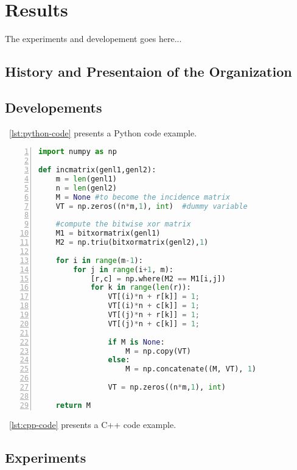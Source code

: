 \chapter{Results}\label{chap:Results}

The experiments and developement goes here...

\section{History and Presentaion of the Organization}


\section{Developements} \label{sec:dev}


\lstlistingname~\ref{lst:python-code} presents a Python code example.

\begin{lstlisting}[numbers=left, language=Python, style=mycode, caption={Python code example.}, label={lst:python-code}]
import numpy as np
 
def incmatrix(genl1,genl2):
    m = len(genl1)
    n = len(genl2)
    M = None #to become the incidence matrix
    VT = np.zeros((n*m,1), int)  #dummy variable
 
    #compute the bitwise xor matrix
    M1 = bitxormatrix(genl1)
    M2 = np.triu(bitxormatrix(genl2),1) 
 
    for i in range(m-1):
        for j in range(i+1, m):
            [r,c] = np.where(M2 == M1[i,j])
            for k in range(len(r)):
                VT[(i)*n + r[k]] = 1;
                VT[(i)*n + c[k]] = 1;
                VT[(j)*n + r[k]] = 1;
                VT[(j)*n + c[k]] = 1;
 
                if M is None:
                    M = np.copy(VT)
                else:
                    M = np.concatenate((M, VT), 1)
 
                VT = np.zeros((n*m,1), int)
 
    return M
\end{lstlisting}

\lstlistingname~\ref{lst:cpp-code} presents a C++ code example.




\section{Experiments} \label{sec:exp}



